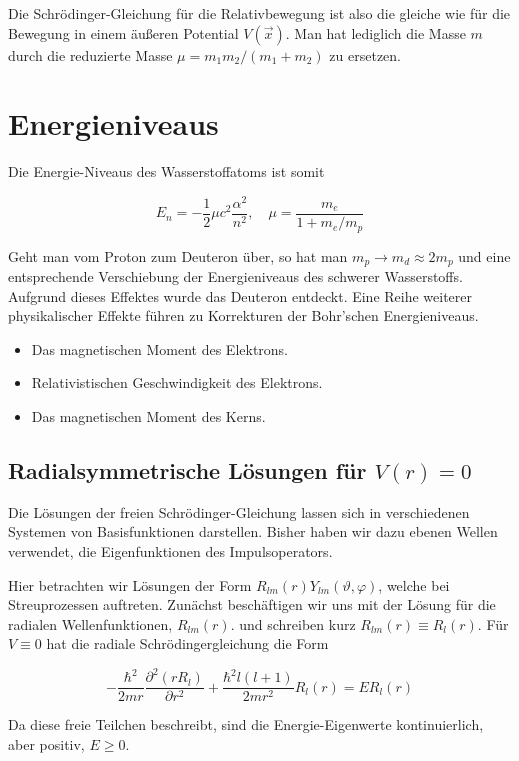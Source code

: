 \documentclass[10pt, letterpaper]{article}
\begin{document}
Die Schrödinger-Gleichung für die Relativbewegung ist also die gleiche wie für die Bewegung in einem äußeren Potential $V(\vec{x})$. Man hat lediglich die Masse $m$ durch die reduzierte Masse $\mu=m_{1} m_{2} /\left(m_{1}+m_{2}\right)$ zu ersetzen.

\section*{Energieniveaus}
Die Energie-Niveaus des Wasserstoffatoms ist somit

$$
E_{n}=-\frac{1}{2} \mu c^{2} \frac{\alpha^{2}}{n^{2}}, \quad \mu=\frac{m_{e}}{1+m_{e} / m_{p}}
$$

Geht man vom Proton zum Deuteron über, so hat man $m_{p} \rightarrow m_{d} \approx 2 m_{p}$ und eine entsprechende Verschiebung der Energieniveaus des schwerer Wasserstoffs. Aufgrund dieses Effektes wurde das Deuteron entdeckt. Eine Reihe weiterer physikalischer Effekte führen zu Korrekturen der Bohr'schen Energieniveaus.

\begin{itemize}
  \item Das magnetischen Moment des Elektrons.
  \item Relativistischen Geschwindigkeit des Elektrons.
  \item Das magnetischen Moment des Kerns.
\end{itemize}

\subsection*{Radialsymmetrische Lösungen für $V(r)=0$}
Die Lösungen der freien Schrödinger-Gleichung lassen sich in verschiedenen Systemen von Basisfunktionen darstellen. Bisher haben wir dazu ebenen Wellen verwendet, die Eigenfunktionen des Impulsoperators.

Hier betrachten wir Lösungen der Form $R_{l m}(r) Y_{l m}(\vartheta, \varphi)$, welche bei Streuprozessen auftreten. Zunächst beschäftigen wir uns mit der Lösung für die radialen Wellenfunktionen, $R_{l m}(r)$. und schreiben kurz $R_{l m}(r) \equiv R_{l}(r)$. Für $V \equiv 0$ hat die radiale Schrödingergleichung die Form

$$
-\frac{\hbar^{2}}{2 m r} \frac{\partial^{2}\left(r R_{l}\right)}{\partial r^{2}}+\frac{\hbar^{2} l(l+1)}{2 m r^{2}} R_{l}(r)=E R_{l}(r)
$$

Da diese freie Teilchen beschreibt, sind die Energie-Eigenwerte kontinuierlich, aber positiv, $E \geq 0$.
\end{document}
